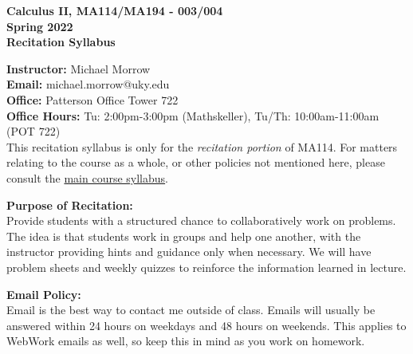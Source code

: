 \documentclass[12pt]{article}
\newcommand{\tbf}[1]{\noindent\textbf{#1}}
\begin{document}
\begin{center}
\Large{\textbf{Calculus II, MA114/MA194 - 003/004}}\\
\Large{\textbf{Spring 2022}}\\
\Large{\textbf{Recitation Syllabus}}
\end{center}

\vspace{0.5cm}

\tbf{Instructor:} Michael Morrow\\
\tbf{Email:} michael.morrow@uky.edu\\
\tbf{Office:} Patterson Office Tower 722\\
\tbf{Office Hours:} Tu: 2:00pm-3:00pm (Mathskeller), Tu/Th: 10:00am-11:00am (POT 722)\\


This recitation syllabus is only for the \emph{recitation portion} of MA114. For matters relating to the course as a whole, or other policies not mentioned here, please consult the \href{http://www.ms.uky.edu/~ma114/f.22/}{main course syllabus}.

\vspace{0.5cm}

\tbf{Purpose of Recitation:}\\
Provide students with a structured chance to collaboratively work on problems. The idea is that students work in groups and help one another, with the instructor providing hints and guidance only when necessary. We will have problem sheets and weekly quizzes to reinforce the information learned in lecture.

\vspace{0.5cm}

\tbf{Email Policy:} \\
Email is the best way to contact me outside of class. Emails will usually be answered within 24 hours on weekdays and 48 hours on weekends. This applies to WebWork emails as well, so keep this in mind as you work on homework.

\vspace{0.5cm}
\end{document}
